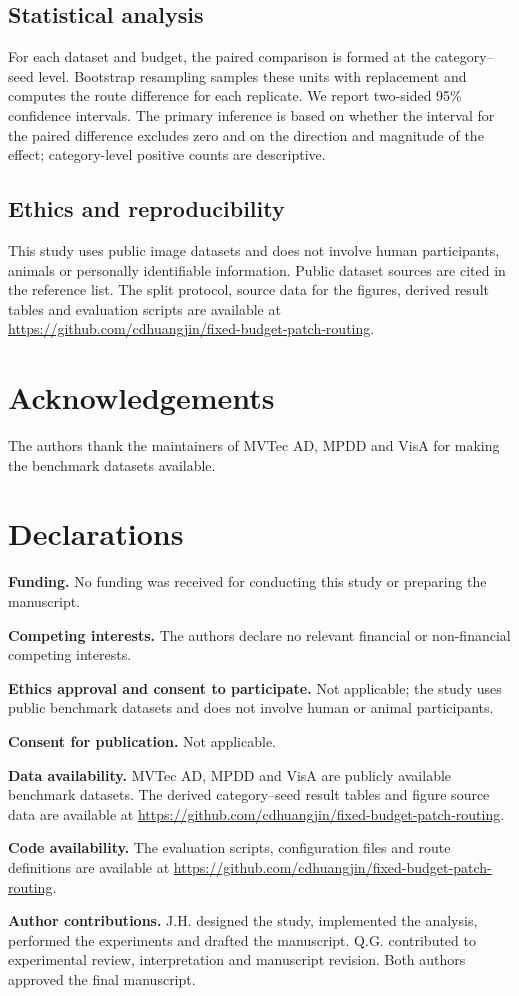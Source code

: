 \documentclass[pdflatex,sn-vancouver-num]{sn-jnl}
\begin{document}
\subsection{Statistical analysis}
For each dataset and budget, the paired comparison is formed at the category--seed level. Bootstrap resampling samples these units with replacement and computes the route difference for each replicate. We report two-sided 95\% confidence intervals. The primary inference is based on whether the interval for the paired difference excludes zero and on the direction and magnitude of the effect; category-level positive counts are descriptive.

\subsection{Ethics and reproducibility}
This study uses public image datasets and does not involve human participants, animals or personally identifiable information. Public dataset sources are cited in the reference list. The split protocol, source data for the figures, derived result tables and evaluation scripts are available at \url{https://github.com/cdhuangjin/fixed-budget-patch-routing}.

\backmatter

\section*{Acknowledgements}
The authors thank the maintainers of MVTec AD, MPDD and VisA for making the benchmark datasets available.

\section*{Declarations}
\textbf{Funding.} No funding was received for conducting this study or preparing the manuscript.

\textbf{Competing interests.} The authors declare no relevant financial or non-financial competing interests.

\textbf{Ethics approval and consent to participate.} Not applicable; the study uses public benchmark datasets and does not involve human or animal participants.

\textbf{Consent for publication.} Not applicable.

\textbf{Data availability.} MVTec AD, MPDD and VisA are publicly available benchmark datasets. The derived category--seed result tables and figure source data are available at \url{https://github.com/cdhuangjin/fixed-budget-patch-routing}.

\textbf{Code availability.} The evaluation scripts, configuration files and route definitions are available at \url{https://github.com/cdhuangjin/fixed-budget-patch-routing}.

\textbf{Author contributions.} J.H. designed the study, implemented the analysis, performed the experiments and drafted the manuscript. Q.G. contributed to experimental review, interpretation and manuscript revision. Both authors approved the final manuscript.


\end{document}
